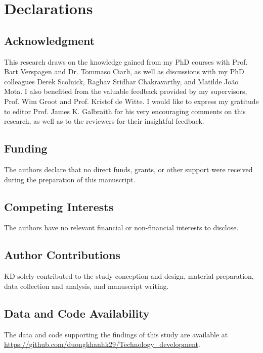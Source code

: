 \section*{Declarations}

\subsection*{Acknowledgment}
This research draws on the knowledge gained from my PhD courses with Prof. Bart Verspagen and Dr. Tommaso Ciarli, as well as discussions with my PhD colleagues Derek Scolnick, Raghav Sridhar Chakravarthy, and Matilde João Mota. I also benefited from the valuable feedback provided by my supervisors, Prof. Wim Groot and Prof. Kristof de Witte. I would like to express my gratitude to editor Prof. James K. Galbraith for his very encouraging comments on this research, as well as to the reviewers for their insightful feedback.

\subsection*{Funding}
The authors declare that no direct funds, grants, or other support were received during the preparation of this manuscript.

\subsection*{Competing Interests}
The authors have no relevant financial or non-financial interests to disclose.

\subsection*{Author Contributions}
KD solely contributed to the study conception and design, material preparation, data collection and analysis, and manuscript writing.

\subsection*{Data and Code Availability}
The data and code supporting the findings of this study are available at \url{https://github.com/duongkhanhk29/Technology_development}.
